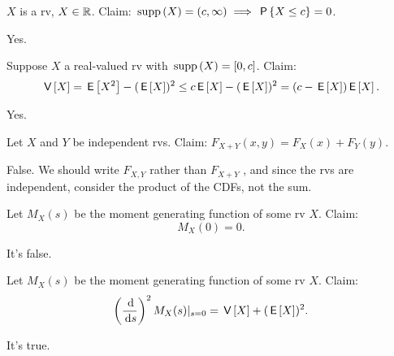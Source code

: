 \documentclass[tf-tutorial-all.tex]{subfiles}
\begin{document}


\begin{truefalse}
$X$ is a rv, $X  \in \mathbb{R}$. Claim: $\,\mathrm{supp}\left(X\right) = (c, \infty) \implies \,\mathsf{P}\left\{X\leq c\right\} = 0$.
\begin{solution}
Yes.
\end{solution}
\end{truefalse}

\begin{truefalse}
Suppose $X$ a real-valued rv with $\,\mathrm{supp}\left(X\right) = [0, c]$. Claim:
\begin{equation}
\,\mathsf{V}\left[X\right] = \,\mathsf{E}\left[X^2\right] - (\,\mathsf{E}\left[X\right])^2 \leq c \,\mathsf{E}\left[X\right] - (\,\mathsf{E}\left[X\right])^2 = (c-\,\mathsf{E}\left[X\right])\,\mathsf{E}\left[X\right].
\end{equation}
\begin{solution}
Yes.
\end{solution}
\end{truefalse}


\begin{truefalse}
Let $X$ and $Y$ be independent rvs. Claim: $F_{X+Y}(x, y) = F_X(x) + F_{Y}(y)$.
\begin{solution}
False. We should write $F_{X,Y}$ rather than $F_{X+Y}$ , and since the rvs are independent, consider the product of the CDFs, not the sum.
\end{solution}
\end{truefalse}

\begin{truefalse}
Let $M_{X}(s)$ be the moment generating function of some rv $X$.  Claim:
\begin{equation}
M_{X}(0) = 0.
\end{equation}
\begin{solution}
It's false.
\end{solution}
\end{truefalse}


\begin{truefalse}
Let $M_{X}(s)$ be the moment generating function of some rv $X$.  Claim:
\begin{equation}
\left(\frac{\d}{\d s}\right)^{2 }M_{X}(s)|_{s=0} =  \V X + (\E{X})^{2}.
\end{equation}
\begin{solution}
It's true.
\end{solution}
\end{truefalse}
\end{document}
